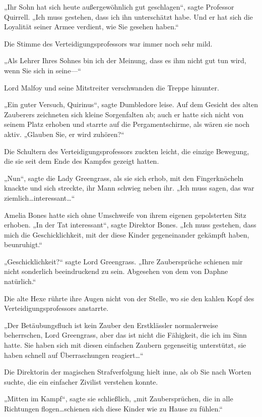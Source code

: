{„Ihr Sohn hat sich heute außergewöhnlich gut geschlagen“, sagte Professor Quirrell. „Ich muss gestehen, dass ich ihn unterschätzt habe. Und er hat sich die Loyalität seiner Armee verdient, wie Sie gesehen haben.“

Die Stimme des Verteidigungsprofessors war immer noch sehr mild.

„Als Lehrer Ihres Sohnes bin ich der Meinung, dass es ihm nicht gut tun wird, wenn Sie sich in seine—“

Lord Malfoy und seine Mitstreiter verschwanden die Treppe hinunter.

„Ein guter Versuch, Quirinus“, sagte Dumbledore leise. Auf dem Gesicht des alten Zauberers zeichneten sich kleine Sorgenfalten ab; auch er hatte sich nicht von seinem Platz erhoben und starrte auf die Pergamentschirme, als wären sie noch aktiv. „Glauben Sie, er wird zuhören?“

Die Schultern des Verteidigungsprofessors zuckten leicht, die einzige Bewegung, die sie seit dem Ende des Kampfes gezeigt hatten.

„Nun“, sagte die Lady Greengrass, als sie sich erhob, mit den Fingerknöcheln knackte und sich streckte, ihr Mann schwieg neben ihr. „Ich muss sagen, das war ziemlich…interessant…“

Amelia Bones hatte sich ohne Umschweife von ihrem eigenen gepolsterten Sitz erhoben. „In der Tat interessant“, sagte Direktor Bones. „Ich muss gestehen, dass mich die Geschicklichkeit, mit der diese Kinder gegeneinander gekämpft haben, beunruhigt.“

„Geschicklichkeit?“ sagte Lord Greengrass. „Ihre Zaubersprüche schienen mir nicht sonderlich beeindruckend zu sein. Abgesehen von dem von Daphne natürlich.“

Die alte Hexe rührte ihre Augen nicht von der Stelle, wo sie den kahlen Kopf des Verteidigungsprofessors anstarrte.

„Der Betäubungsfluch ist kein Zauber den Erstklässler normalerweise beherrschen, Lord Greengrass, aber das ist nicht die Fähigkeit, die ich im Sinn hatte. Sie haben sich mit diesen einfachen Zaubern gegenseitig unterstützt, sie haben schnell auf Überraschungen reagiert…“

Die Direktorin der magischen Strafverfolgung hielt inne, als ob Sie nach Worten suchte, die ein einfacher Zivilist verstehen konnte.

„Mitten im Kampf“, sagte sie schließlich, „mit Zaubersprüchen, die in alle Richtungen flogen…schienen sich diese Kinder wie zu Hause zu fühlen.“

}
